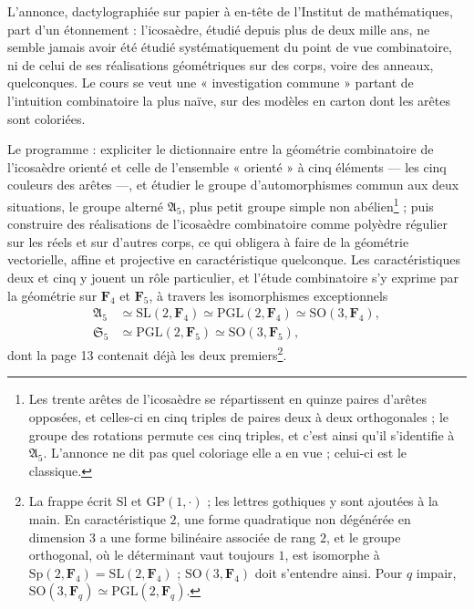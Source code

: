 \documentclass[11pt,a4paper]{article}
\begin{document}
L'annonce, dactylographiée sur papier à en-tête de l'Institut de
mathématiques, part d'un étonnement : l'icosaèdre, étudié depuis plus de deux
mille ans, ne semble jamais avoir été étudié systématiquement du point de vue
combinatoire, ni de celui de ses réalisations géométriques sur des corps,
voire des anneaux, quelconques. Le cours se veut une « investigation commune »
partant de l'intuition combinatoire la plus naïve, sur des modèles en carton
dont les arêtes sont coloriées.

Le programme : expliciter le dictionnaire entre la géométrie combinatoire de
l'icosaèdre orienté et celle de l'ensemble « orienté » à cinq éléments --- les
cinq couleurs des arêtes ---, et étudier le groupe d'automorphismes commun aux
deux situations, le groupe alterné $\mathfrak{A}_5$, plus petit groupe simple
non abélien\footnote{Les trente arêtes de l'icosaèdre se répartissent en
quinze paires d'arêtes opposées, et celles-ci en cinq triples de paires deux à
deux orthogonales ; le groupe des rotations permute ces cinq triples, et c'est
ainsi qu'il s'identifie à $\mathfrak{A}_5$. L'annonce ne dit pas quel
coloriage elle a en vue ; celui-ci est le classique.} ; puis construire des
réalisations de l'icosaèdre combinatoire comme polyèdre régulier sur les réels
et sur d'autres corps, ce qui obligera à faire de la géométrie vectorielle,
affine et projective en caractéristique quelconque. Les caractéristiques deux
et cinq y jouent un rôle particulier, et l'étude combinatoire s'y exprime par
la géométrie sur $\mathbf{F}_4$ et $\mathbf{F}_5$, à travers les isomorphismes
exceptionnels
\begin{align*}
  \mathfrak{A}_5 &\simeq \mathrm{SL}(2, \mathbf{F}_4) \simeq \mathrm{PGL}(2,
    \mathbf{F}_4) \simeq \mathrm{SO}(3, \mathbf{F}_4), \\
  \mathfrak{S}_5 &\simeq \mathrm{PGL}(2, \mathbf{F}_5) \simeq \mathrm{SO}(3,
    \mathbf{F}_5),
\end{align*}
dont la page 13 contenait déjà les deux premiers\footnote{La frappe écrit
$\mathrm{Sl}$ et $\mathrm{GP}(1, \cdot)$ ; les lettres gothiques y sont
ajoutées à la main. En caractéristique $2$, une forme quadratique non
dégénérée en dimension $3$ a une forme bilinéaire associée de rang $2$, et le
groupe orthogonal, où le déterminant vaut toujours $1$, est isomorphe à
$\mathrm{Sp}(2, \mathbf{F}_4) = \mathrm{SL}(2, \mathbf{F}_4)$ ;
$\mathrm{SO}(3, \mathbf{F}_4)$ doit s'entendre ainsi. Pour $q$ impair,
$\mathrm{SO}(3, \mathbf{F}_q) \simeq \mathrm{PGL}(2, \mathbf{F}_q)$.}.
\end{document}

